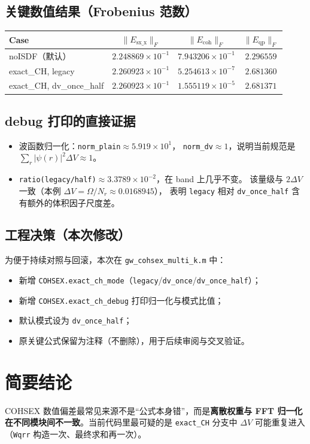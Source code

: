 \documentclass[11pt]{article}
\begin{document}
\subsection{关键数值结果（Frobenius 范数）}
\begin{center}
\begin{tabular}{lccc}
\toprule
Case & $\|E_{\mathrm{sx\_x}}\|_F$ & $\|E_{\mathrm{coh}}\|_F$ & $\|E_{\mathrm{qp}}\|_F$ \\
\midrule
noISDF（默认） & $2.248869\times10^{-1}$ & $7.943206\times10^{-1}$ & $2.296559$ \\
exact\_CH, legacy & $2.260923\times10^{-1}$ & $5.254613\times10^{-7}$ & $2.681360$ \\
exact\_CH, dv\_once\_half & $2.260923\times10^{-1}$ & $1.555119\times10^{-5}$ & $2.681371$ \\
\bottomrule
\end{tabular}
\end{center}

\subsection{debug 打印的直接证据}
\begin{itemize}
  \item 波函数归一化：\texttt{norm\_plain}$\approx 5.919\times 10^1$，
  \texttt{norm\_dv}$\approx 1$，说明当前规范是
  $\sum_r |\psi(r)|^2 \Delta V \approx 1$。
  \item \texttt{ratio(legacy/half)}$\approx 3.3789\times10^{-2}$，在 band 上几乎不变。
  该量级与 $2\Delta V$ 一致（本例 $\Delta V=\Omega/N_r\approx 0.0168945$），
  表明 \texttt{legacy} 相对 \texttt{dv\_once\_half} 含有额外的体积因子尺度差。
\end{itemize}

\subsection{工程决策（本次修改）}
为便于持续对照与回滚，本次在 \texttt{gw\_cohsex\_multi\_k.m} 中：
\begin{itemize}
  \item 新增 \texttt{COHSEX.exact\_ch\_mode}（\texttt{legacy}/\texttt{dv\_once}/\texttt{dv\_once\_half}）；
  \item 新增 \texttt{COHSEX.exact\_ch\_debug} 打印归一化与模式比值；
  \item 默认模式设为 \texttt{dv\_once\_half}；
  \item 原关键公式保留为注释（不删除），用于后续审阅与交叉验证。
\end{itemize}

\section{简要结论}
COHSEX 数值偏差最常见来源不是“公式本身错”，而是\textbf{离散权重与 FFT 归一化在不同模块间不一致}。当前代码里最可疑的是 \texttt{exact\_CH} 分支中 $\Delta V$ 可能重复进入（\texttt{Wqrr} 构造一次、最终求和再一次）。
\end{document}
